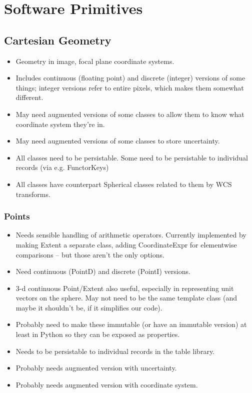 \section{Software Primitives}
\label{sec:software-primitives}

\subsection{Cartesian Geometry}
\label{sec:spCartesianGeometry}

\begin{itemize}
\item Geometry in image, focal plane coordinate systems.
\item Includes continuous (floating point) and discrete (integer) versions of some things; integer versions refer to entire pixels, which makes them somewhat different.
\item May need augmented versions of some classes to allow them to know what coordinate system they're in.
\item May need augmented versions of some classes to store uncertainty.
\item All classes need to be persistable.  Some need to be persistable to individual records (via e.g. FunctorKeys)
\item All classes have counterpart Spherical classes related to them by WCS transforms.
\end{itemize}

\subsubsection{Points}
\label{sec:spCartesianPoints}

\begin{itemize}
\item Needs sensible handling of arithmetic operators.  Currently implemented by making Extent a separate class, adding CoordinateExpr for elementwise comparisons -- but those aren't the only options.
\item Need continuous (PointD) and discrete (PointI) versions.
\item 3-d continuous Point/Extent also useful, especially in representing unit vectors on the sphere.  May not need to be the same template class (and maybe it shouldn't be, if it simplifies our code).
\item Probably need to make these immutable (or have an immutable version) at least in Python so they can be exposed as properties.
\item Needs to be persistable to individual records in the table library.
\item Probably needs augmented version with uncertainty.
\item Probably needs augmented version with coordinate system.
\end{itemize}

